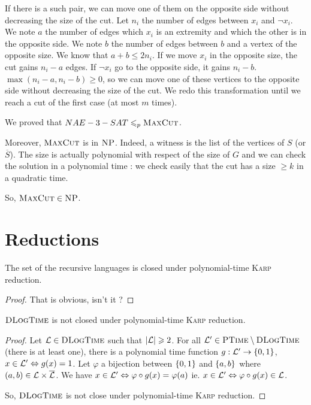 If there is a such pair, we can move one of them on the opposite side without decreasing the size of the cut. Let $n_i$ the number of edges between $x_i$ and $\neg x_i$. We note $a$ the number of edges which $x_i$ is an extremity and which the other is in the opposite side. We note $b$ the number of edges between $b$ and a vertex of the opposite size. We know that $a+b \leqslant 2n_i$. If we move $x_i$ in the opposite size, the cut gains $n_i-a$ edges. If $\neg x_i$ go to the opposite side, it gains $n_i-b$. $\max(n_i-a,n_i-b)\geqslant 0$, so we can move one of these vertices to the opposite side without decreasing the size of the cut. We redo this transformation until we reach a cut of the first case (at most $m$ times).

We proved that $NAE-3-SAT \leqslant_p \textsc{MaxCut}$.

Moreover, $\textsc{MaxCut}$ is in $\textsc{NP}$. Indeed, a witness is the list of the vertices of $S$ (or $\overline{S}$). The size is actually polynomial with respect of the size of $G$ and we can check the solution in a polynomial time : we check easily that the cut has a size $\geqslant k$ in a quadratic time.

So, $\textsc{MaxCut}\in\textsc{NP}$.


\section{Reductions}
\begin{propo}
    The set of the recursive languages is closed under polynomial-time \textsc{Karp} reduction.
\end{propo}
\begin{proof}
    That is obvious, isn't it ?
\end{proof}
\begin{propo}
    $\textsc{DLogTime}$ is not closed under polynomial-time \textsc{Karp} reduction.
\end{propo}
\begin{proof}
    Let $\mathcal{L} \in \textsc{DLogTime}$ such that $\lvert \mathcal{L} \rvert \geqslant 2$. For all $\mathcal{L}' \in \textsc{PTime}\setminus\textsc{DLogTime}$ (there is at least one), there is a polynomial time function $g:\mathcal{L}' \to \left\{ 0,1 \right\}$, $x\in\mathcal{L}' \Leftrightarrow g(x) = 1$. Let $\varphi$ a bijection between $\left\{ 0,1 \right\}$ and $\left\{ a,b \right\}$ where $(a,b)\in\mathcal{L}\times\overline{\mathcal{L}}$. We have $x\in\mathcal{L}' \Leftrightarrow \varphi\circ g(x) = \varphi(a)$ ie. $x\in\mathcal{L}' \Leftrightarrow \varphi\circ g(x)\in\mathcal{L}$.
    
    So, $\textsc{DLogTime}$ is not close under polynomial-time \textsc{Karp} reduction.
\end{proof}

